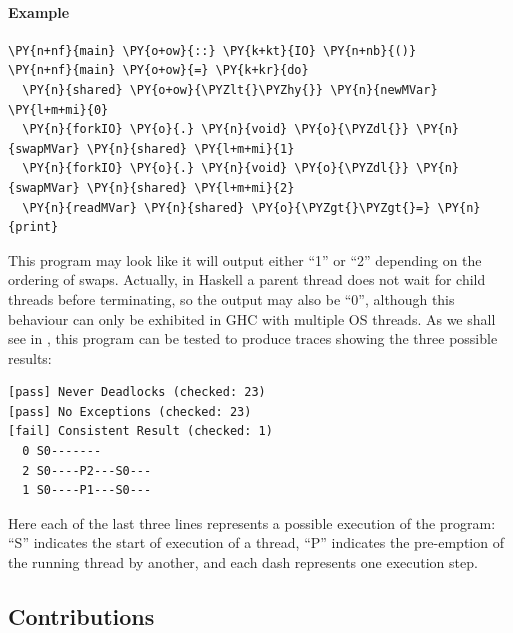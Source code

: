 \begin{justspacing}
\paragraph{Example}


\begin{Verbatim}[commandchars=\\\{\}, ]
\PY{n+nf}{main} \PY{o+ow}{::} \PY{k+kt}{IO} \PY{n+nb}{()}
\PY{n+nf}{main} \PY{o+ow}{=} \PY{k+kr}{do}
  \PY{n}{shared} \PY{o+ow}{\PYZlt{}\PYZhy{}} \PY{n}{newMVar} \PY{l+m+mi}{0}
  \PY{n}{forkIO} \PY{o}{.} \PY{n}{void} \PY{o}{\PYZdl{}} \PY{n}{swapMVar} \PY{n}{shared} \PY{l+m+mi}{1}
  \PY{n}{forkIO} \PY{o}{.} \PY{n}{void} \PY{o}{\PYZdl{}} \PY{n}{swapMVar} \PY{n}{shared} \PY{l+m+mi}{2}
  \PY{n}{readMVar} \PY{n}{shared} \PY{o}{\PYZgt{}\PYZgt{}=} \PY{n}{print}
\end{Verbatim}

This program may look like it will output either ``1'' or ``2''
depending on the ordering of swaps. Actually, in Haskell a parent
thread does not wait for child threads before
terminating\cite{parconc}, so the output may also be ``0'', although
this behaviour can only be exhibited in GHC with multiple OS
threads. As we shall see in , this program can be tested
to produce traces showing the three possible results:

\begin{verbatim}
[pass] Never Deadlocks (checked: 23)
[pass] No Exceptions (checked: 23)
[fail] Consistent Result (checked: 1)
  0 S0-------
  2 S0----P2---S0---
  1 S0----P1---S0---
\end{verbatim}

Here each of the last three lines represents a possible execution of
the program: ``S'' indicates the start of execution of a thread, ``P''
indicates the pre-emption of the running thread by another, and each
dash represents one execution step.
\end{justspacing}

\subsection*{Contributions}
\label{sec:dejafu-intro-contribs}


